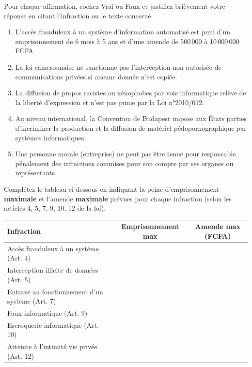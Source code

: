 \documentclass[11pt]{article}
\begin{document}
\begin{exercice}
Pour chaque affirmation, cochez Vrai ou Faux et justifiez brièvement votre réponse en citant l'infraction ou le texte concerné.
\begin{enumerate}
    \item L'accès frauduleux à un système d'information automatisé est puni d'un emprisonnement de 6 mois à 5 ans et d'une amende de 500\,000 à 10\,000\,000 FCFA.
    \item La loi camerounaise ne sanctionne pas l'interception non autorisée de communications privées si aucune donnée n'est copiée.
    \item La diffusion de propos racistes ou xénophobes par voie informatique relève de la liberté d'expression et n'est pas punie par la Loi n°2010/012.
    \item Au niveau international, la Convention de Budapest impose aux États parties d'incriminer la production et la diffusion de matériel pédopornographique par systèmes informatiques.
    \item Une personne morale (entreprise) ne peut pas être tenue pour responsable pénalement des infractions commises pour son compte par ses organes ou représentants.
\end{enumerate}
\end{exercice}

\begin{exercice}
Complétez le tableau ci-dessous en indiquant la peine d'emprisonnement \textbf{maximale} et l'amende \textbf{maximale} prévues pour chaque infraction (selon les articles 4, 5, 7, 9, 10, 12 de la loi).
\begin{center}
\begin{tabular}{|p{4.5cm}|c|c|}
\hline
\textbf{Infraction} & \textbf{Emprisonnement max} & \textbf{Amende max (FCFA)} \\
\hline
Accès frauduleux à un système (Art. 4) & & \\
\hline
Interception illicite de données (Art. 5) & & \\
\hline
Entrave au fonctionnement d'un système (Art. 7) & & \\
\hline
Faux informatique (Art. 9) & & \\
\hline
Escroquerie informatique (Art. 10) & & \\
\hline
Atteinte à l'intimité vie privée (Art. 12) & & \\
\hline
\end{tabular}
\end{center}
\end{exercice}
\end{document}
